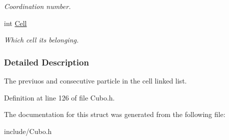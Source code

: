 \begin{DoxyCompactItemize}
\begin{DoxyCompactList}\small\item\em Coordination number. \end{DoxyCompactList}\item 
int \hyperlink{structDOMAIN__PART_ab77aad3f51cc44ef2c0649e543c19c9d}{Cell}\hypertarget{structDOMAIN__PART_ab77aad3f51cc44ef2c0649e543c19c9d}{}\label{structDOMAIN__PART_ab77aad3f51cc44ef2c0649e543c19c9d}

\begin{DoxyCompactList}\small\item\em Which cell it\textquotesingle{}s belonging. \end{DoxyCompactList}\end{DoxyCompactItemize}


\subsubsection{Detailed Description}
The previuos and consecutive particle in the cell linked list. 

Definition at line 126 of file Cubo.\+h.



The documentation for this struct was generated from the following file\+:\begin{DoxyCompactItemize}
\item 
include/Cubo.\+h\end{DoxyCompactItemize}
